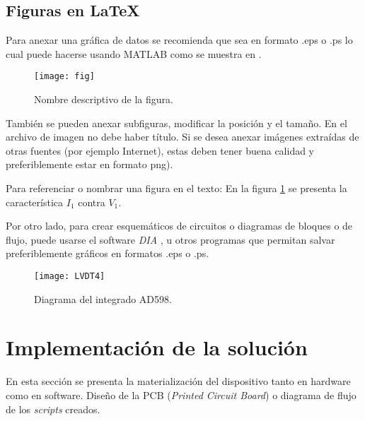 \subsection{Figuras en \LaTeX}
Para anexar una gráfica de datos se recomienda que sea en formato .eps o .ps lo cual puede hacerse usando MATLAB como se muestra en \cite{imagenes}. 
\begin{figure}[H] %
\centering  %
\texttt{[image: fig]} %
\caption{Nombre descriptivo de la figura.} %
\label{lvdt4} %
\end{figure}
También se pueden anexar subfiguras, modificar la posición y el tamaño. En el archivo de imagen no debe haber título. Si se desea anexar imágenes extraídas de otras fuentes (por ejemplo Internet), estas deben tener buena calidad y preferiblemente estar en formato png).

Para referenciar o nombrar una figura en el texto: En la figura \ref{lvdt4} se presenta la característica $I_1$ contra $V_1$.

Por otro lado, para crear esquemáticos de circuitos o diagramas de bloques o de flujo, puede usarse el software \emph{DIA} \cite{dia}, u otros programas que permitan salvar preferiblemente gráficos en formatos .eps o .ps. 
\begin{figure}[H] %
\centering  %
\texttt{[image: LVDT4]} %
\caption{Diagrama del integrado AD598.} %
\label{diafig} %
\end{figure}

\section{Implementación de la solución}
En esta sección se presenta la materialización del dispositivo tanto en hardware como en software. Diseño de la PCB (\emph{Printed Circuit Board}) o diagrama de flujo de los \emph{scripts} creados.


